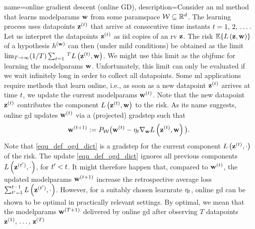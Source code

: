 {name={online gradient descent (online GD)}, 
	description={Consider  an \gls{ml} method that learns \gls{modelparams} 
		${\bf w}$ from some \gls{paramspace} $\mathcal{W} \subseteq \mathbb{R}^{d}$. 
		The learning process uses \glspl{datapoint} ${\bf z}^{(t)}$ that arrive at consecutive time instants $t=1, \,2, \,\dots$. 
		Let us interpret the \glspl{datapoint} ${\bf z}^{(t)}$ as \gls{iid} copies 
		of an \gls{rv} ${\bf z}$. The \gls{risk} $\mathbb{E}\{ L\left({\bf z},{\bf w} \right) \}$ of a 
		\gls{hypothesis} $h^{({\bf w})}$ can then (under mild conditions) be obtained as the limit 
		$\lim_{T\rightarrow \infty} (1/T)\sum_{t=1}\,^{T} L\left({\bf z}^{(t)},{\bf w} \right)$. 
		We might use this limit as the \gls{objfunc} for learning the \gls{modelparams} ${\bf w}$. 
		Unfortunately, this limit can only be evaluated if we wait infinitely long in order to collect all \glspl{datapoint}. 
		Some \gls{ml} applications require methods that learn online, i.e., as soon as a new \gls{datapoint} ${\bf z}^{(t)}$ 
		arrives at time $t$, we update the current \gls{modelparams} ${\bf w}^{(t)}$. Note that 
		the new \gls{datapoint} ${\bf z}^{(t)}$ contributes the component $L\left({\bf z}^{(t)},{\bf w} \right)$ 
		to the \gls{risk}. As its name suggests, online \gls{gd} updates ${\bf w}^{(t)}$ via a (projected) \gls{gradstep} such that
		\begin{equation} 
			\label{equ_def_ogd_dict}
 			{\bf w}^{(t+1)} := P_{\mathcal{W}}\big( {\bf w}^{(t)} - \eta_{t} \nabla_{{\bf w}} L\left({\bf z}^{(t)},{\bf w} \right)\big). 
		\end{equation} 
		Note that \eqref{equ_def_ogd_dict} is a \gls{gradstep} for the current component $L\left({\bf z}^{(t)},\cdot \right)$ 
		of the \gls{risk}. The update \eqref{equ_def_ogd_dict} ignores all previous components $L\left({\bf z}^{(t')},\cdot \right)$, 
		for $t' < t$. It might therefore happen that, compared to ${\bf w}^{(t)}$, the updated \gls{modelparams} 
		${\bf w}^{(t+1)}$ increase the retrospective average \gls{loss} $\sum_{t'=1}^{t-1} L\left({\bf z}^{(t')},\cdot \right)$. 
		However, for a suitably chosen \gls{learnrate} $\eta_{t}$, online \gls{gd} can be shown 
		to be optimal in practically relevant settings. By optimal, we mean that the \gls{modelparams} 
		${\bf w}^{(T+1)}$ delivered by online \gls{gd} after observing $T$ \glspl{datapoint} ${\bf z}^{(1)}, \,\ldots, \,{\bf z}^{(T)}$ 
}}
